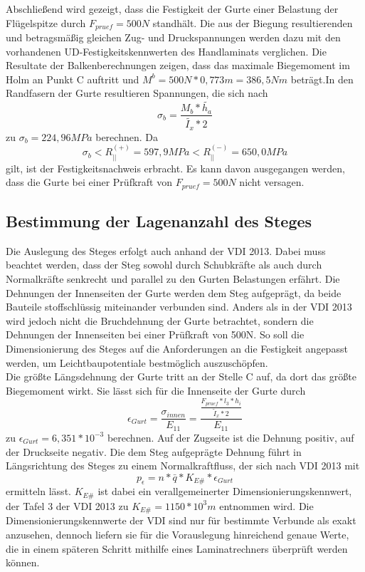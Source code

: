 \noindent Abschließend wird gezeigt, dass die Festigkeit der Gurte einer Belastung der Flügelspitze durch $ F_{pruef}=500N $ standhält. Die aus der Biegung resultierenden und betragsmäßig gleichen Zug- und Druckspannungen werden dazu mit den vorhandenen UD-Festigkeitskennwerten des Handlaminats verglichen. Die Resultate der Balkenberechnungen zeigen, dass das maximale Biegemoment im Holm an Punkt C auftritt und $ M^{b}=500N*0,773m=386,5Nm $ beträgt.In den Randfasern der Gurte resultieren Spannungen, die sich nach\\
\begin{equation}
	\sigma_{b}=\frac{M_{b}*\tilde{h_{a}}}{\tilde{I_{x}}*2}
\end{equation} 
zu $ \sigma_{b}=224,96MPa $ berechnen. Da 
\begin{equation}
	\sigma_{b}< R^{(+)}_{||}=597,9 MPa < R^{(-)}_{||}=650,0 MPa
\end{equation} 
gilt, ist der Festigkeitsnachweis erbracht. Es kann davon ausgegangen werden, dass die Gurte bei einer Prüfkraft von $ F_{pruef}=500N $ nicht versagen. \\

\subsection{Bestimmung der Lagenanzahl des Steges}
Die Auslegung des Steges erfolgt auch anhand der VDI 2013. Dabei muss beachtet werden, dass der Steg sowohl durch Schubkräfte als auch durch Normalkräfte senkrecht und parallel zu den Gurten Belastungen erfährt. Die Dehnungen der Innenseiten der Gurte werden dem Steg aufgeprägt, da beide Bauteile stoffschlüssig miteinander verbunden sind. Anders als in der VDI 2013 wird jedoch nicht die Bruchdehnung der Gurte betrachtet, sondern die Dehnungen der Innenseiten bei einer Prüfkraft von 500N. So soll die Dimensionierung des Steges auf die Anforderungen an die Festigkeit angepasst werden, um Leichtbaupotentiale bestmöglich auszuschöpfen.\\

\noindent Die größte Längsdehnung der Gurte tritt an der Stelle C auf, da dort das größte Biegemoment wirkt. Sie lässt sich für die Innenseite der Gurte durch
\begin{equation}
	\epsilon_{Gurt}=\frac{\sigma_{innen}}{E_{11}}=\frac{\frac{F_{pruef}*l_{3}*h_{i}}{\tilde{I}_{x}*2}}{E_{11}}
\end{equation}  
 zu $ \epsilon_{Gurt}=6,351*10^{-3} $ berechnen. Auf der Zugseite ist die Dehnung positiv, auf der Druckseite negativ. Die dem Steg aufgeprägte Dehnung führt in Längsrichtung des Steges zu einem Normalkraftfluss, der sich nach VDI 2013 mit
 \begin{equation}
 	p_{\epsilon}=n*\bar{q}*K_{E\#}*\epsilon_{Gurt}
 \end{equation} 
ermitteln lässt. $ K_{E\#} $ ist dabei ein verallgemeinerter Dimensionierungskennwert, der Tafel 3 der VDI 2013 zu $ K_{E\#}=1150*10^{3}m $ entnommen wird. Die Dimensionierungskennwerte der VDI sind nur für bestimmte Verbunde als exakt anzusehen, dennoch liefern sie für die Vorauslegung hinreichend genaue Werte, die in einem späteren Schritt mithilfe eines Laminatrechners überprüft werden können.\\

